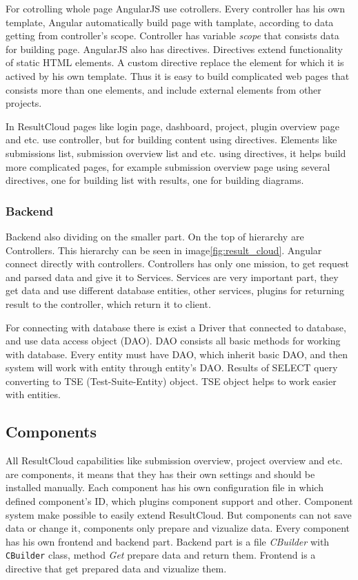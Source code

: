 For cotrolling whole page AngularJS use cotrollers. Every controller has his own template, Angular automatically build page with tamplate, according to data getting from controller's scope. Controller has variable \emph{scope} that consists data for building page. AngularJS also has directives. Directives extend functionality of static HTML elements. A custom directive replace the element for which it is actived by his own template. Thus it is easy to build complicated web pages that consists more than one elements, and include external elements from other projects.

In ResultCloud pages like login page, dashboard, project, plugin overview page and etc. use controller, but for building content using directives. Elements like submissions list, submission overview list and etc. using directives, it helps build more complicated pages, for example submission overview page using several directives, one for building list with results, one for building diagrams. 

\subsubsection{Backend}

Backend also dividing on the smaller part. On the top of hierarchy are Controllers. This hierarchy can be seen in image\ref{fig:result_cloud}. Angular connect directly with controllers. Controllers has only one mission, to get request and parsed data and give it to Services. Services are very important part, they get data and use different database entities, other services, plugins for returning result to the controller, which return it to client.

For connecting with database there is exist a Driver that connected to database, and use data access object (DAO). DAO consists all basic methods for working with database. Every entity must have DAO, which inherit basic DAO, and then system will work with entity through entity's DAO. Results of SELECT query converting to TSE (Test-Suite-Entity) object. TSE object helps to work easier with entities.


\subsection{Components}

All ResultCloud capabilities like submission overview, project overview and etc. are components, it means that they has their own settings and should be installed manually. Each component has his own configuration file in which defined component's ID, which plugins component support and other. Component system make possible to easily extend ResultCloud. But components can not save data or change it, components only prepare and vizualize data. Every component has his own frontend and backend part. Backend part is a file \emph{CBuilder} with \texttt{CBuilder} class, method \emph{Get} prepare data and return them. Frontend is a directive that get prepared data and vizualize them.   


